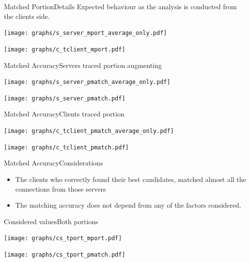 	\begin{frame}{Matched Portion}{Details}
			\small Expected behaviour as the analysis is conducted from the clients side.

			\begin{minipage}{.5\textwidth}
				\texttt{[image: graphs/s\_server\_mport\_average\_only.pdf]}
			\end{minipage}
			\begin{minipage}{.4\textwidth}
				\texttt{[image: graphs/c\_tclient\_mport.pdf]}
			\end{minipage}
	\end{frame}
	\begin{frame}{Matched Accuracy}{Servers traced portion augmenting}
		\begin{minipage}{.5\textwidth}
			\texttt{[image: graphs/s\_server\_pmatch\_average\_only.pdf]}
		\end{minipage}
		\begin{minipage}{.4\textwidth}
			\texttt{[image: graphs/s\_server\_pmatch.pdf]} 
		\end{minipage}
	\end{frame}
	\begin{frame}{Matched Accuracy}{Clients traced portion}
		\begin{minipage}{.5\textwidth}
			\texttt{[image: graphs/c\_tclient\_pmatch\_average\_only.pdf]}
		\end{minipage}
		\begin{minipage}{.4\textwidth}
			\texttt{[image: graphs/c\_tclient\_pmatch.pdf]}
		\end{minipage}
	\end{frame}
	\begin{frame}{Matched Accuracy}{Considerations}
		\begin{itemize}
			\item The clients who correctly found their best candidates,
matched almost all
the connections from those servers
			\item The matching accuracy does not depend from any of the
factors considered.	
		\end{itemize}
	\end{frame}
	\begin{frame}{Considered values}{Both portions}
		\begin{minipage}{.5\textwidth}
			\texttt{[image: graphs/cs\_tport\_mport.pdf]}
		\end{minipage}
		\begin{minipage}{.4\textwidth}
			\texttt{[image: graphs/cs\_tport\_pmatch.pdf]} 
		\end{minipage}
	\end{frame}

